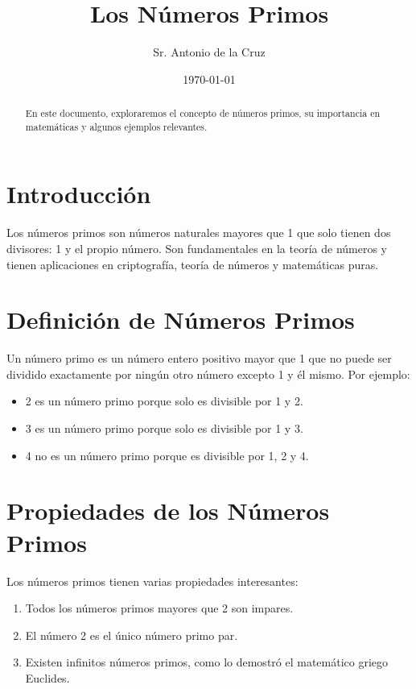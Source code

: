 \documentclass[a4paper,12pt]{article} %
\title{Los Números Primos}
\author{Sr. Antonio de la Cruz}
\date{\today}
\begin{document}
\maketitle

\begin{abstract}
    En este documento, exploraremos el concepto de números primos, su importancia en matemáticas y algunos ejemplos relevantes.
\end{abstract}

\tableofcontents %

\section{Introducción}
Los números primos son números naturales mayores que 1 que solo tienen dos divisores: 1 y el propio número. Son fundamentales en la teoría de números y tienen aplicaciones en criptografía, teoría de números y matemáticas puras.

\section{Definición de Números Primos}
Un número primo es un número entero positivo mayor que 1 que no puede ser dividido exactamente por ningún otro número excepto 1 y él mismo. Por ejemplo:

\begin{itemize}
    \item 2 es un número primo porque solo es divisible por 1 y 2.
    \item 3 es un número primo porque solo es divisible por 1 y 3.
    \item 4 no es un número primo porque es divisible por 1, 2 y 4.
\end{itemize}

\section{Propiedades de los Números Primos}
Los números primos tienen varias propiedades interesantes:

\begin{enumerate}
    \item Todos los números primos mayores que 2 son impares.
    \item El número 2 es el único número primo par.
    \item Existen infinitos números primos, como lo demostró el matemático griego Euclides.
\end{enumerate}
\end{document}
